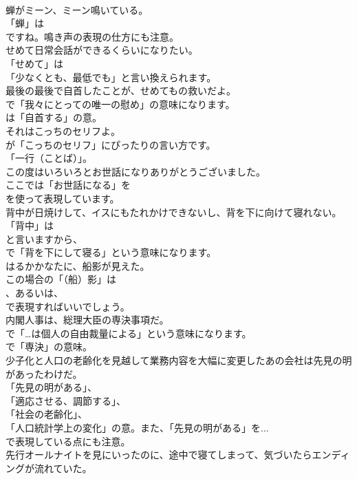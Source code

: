 \documentclass[8pt]{extreport}
\begin{document}
\begin{CJK}{UTF8}{min}
\\	蝉がミーン、ミーン鳴いている。 
\\	「蝉」は 
\\	ですね。鳴き声の表現の仕方にも注意。	
\\	せめて日常会話ができるくらいになりたい。 
\\	「せめて」は
\\	「少なくとも、最低でも」と言い換えられます。	
\\	最後の最後で自首したことが、せめてもの救いだよ。 
\\	で「我々にとっての唯一の慰め」の意味になります。
\\	は「自首する」の意。	
\\	それはこっちのセリフよ。 
\\	が「こっちのセリフ」にぴったりの言い方です。
\\	「一行（ことば）」。	
\\	この度はいろいろとお世話になりありがとうございました。 
\\	ここでは「お世話になる」を
\\	を使って表現しています。	
\\	背中が日焼けして、イスにもたれかけできないし、背を下に向けて寝れない。 
\\	「背中」は
\\	と言いますから、
\\	で「背を下にして寝る」という意味になります。	
\\	はるかかなたに、船影が見えた。 
\\	この場合の「（船）影」は
\\	、あるいは、
\\	で表現すればいいでしょう。	
\\	内閣人事は、総理大臣の専決事項だ。 
\\	で「…は個人の自由裁量による」という意味になります。
\\	で「専決」の意味。	
\\	少子化と人口の老齢化を見越して業務内容を大幅に変更したあの会社は先見の明があったわけだ。 
\\	「先見の明がある」、
\\	「適応させる、調節する」、
\\	「社会の老齢化」、
\\	「人口統計学上の変化」の意。また、「先見の明がある」を... 
\\	で表現している点にも注意。	
\\	先行オールナイトを見にいったのに、途中で寝てしまって、気づいたらエンディングが流れていた。 

\end{CJK}
\end{document}
